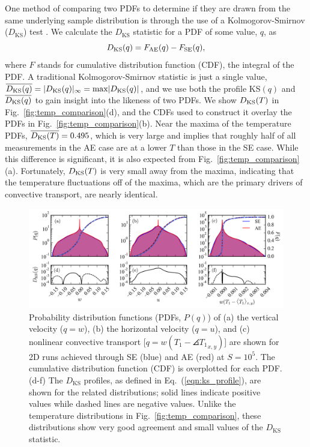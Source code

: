 One method of comparing two PDFs to determine if they are drawn from the same underlying sample distribution is through the use of a Kolmogorov-Smirnov ($D_{\text{KS}}$) test \cite{wall&jenkins2012}.
We calculate the $D_{\text{KS}}$ statistic for a PDF of some value, $q$, as
\begin{equation}
D_{\text{KS}}(q) = F_{\text{AE}}(q) - F_{\text{SE}}(q),
\label{eqn:ks_profile}
\end{equation}
where $F$ stands for cumulative distribution function (CDF), the integral of the PDF.
A traditional Kolmogorov-Smirnov statistic is just a single value, $\overline{D_\text{KS}(q)} = |D_{\text{KS}}(q)|_\infty = \text{max} |D_{\text{KS}}(q)|$, and we use both the profile KS$(q)$ and $\overline{D_\text{KS}(q)}$ to gain insight into the likeness of two PDFs. 
We show $D_{\text{KS}}(T)$ in Fig.~\ref{fig:temp_comparison}(d), and the CDFs used to construct it overlay the PDFs in Fig.~\ref{fig:temp_comparison}(b).
Near the maxima of the temperature PDFs, $\overline{D_\text{KS}(T)} = 0.495$, which is very large and implies that roughly half of all measurements in the AE case are at a lower $T$ than those in the SE case.
While this difference is significant, it is also expected from Fig.~\ref{fig:temp_comparison}(a).
Fortunately, $D_{\text{KS}}(T)$ is very small away from the maxima, indicating that the temperature fluctuations off of the maxima, which are the primary drivers of convective transport, are nearly identical.

\begin{figure}[bt!]
\includegraphics[width=\textwidth]{./figs/pdf_comparison.pdf}
\caption[Probability distribution comparison of AE and SE dynamics]
{
	Probability distribution functions (PDFs, $P(q)$) of (a) the vertical velocity ($q = w$), (b) the horizontal velocity ($q = u$), and (c) nonlinear convective transport [$q = w(T_1 - \angles{T_1}_{x,y})$] are shown for 2D runs achieved through SE (blue) and AE (red) at $S = 10^{5}$.  
	The cumulative distribution function (CDF) is overplotted for each PDF. 
	(d-f) The $D_{\text{KS}}$ profiles, as defined in Eq.~(\ref{eqn:ks_profile}), are shown for the related distributions; solid lines indicate positive values while dashed lines are negative values. 
	Unlike the temperature distributions in Fig.~\ref{fig:temp_comparison}, these distributions show very good agreement and small values of the $D_{\text{KS}}$ statistic.
	\label{fig:pdf_comparison} 
}
\end{figure}

